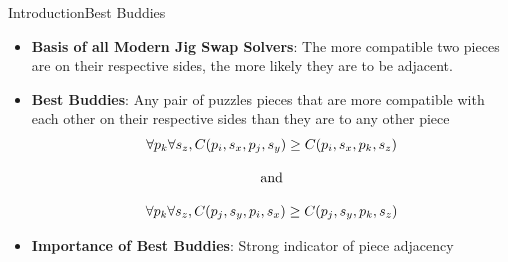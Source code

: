 \documentclass[10pt]{beamer}
\begin{document}
\begin{frame}{Introduction}{Best Buddies}\label{frame:bestBuddies}
    \begin{itemize}
        \item \textbf{Basis of all Modern Jig Swap Solvers}: The more compatible two pieces are on their respective sides, the more likely they are to be adjacent.
        \vfill
        \item \textbf{Best Buddies}: Any pair of puzzles pieces that are more compatible with each other on their respective sides than they are to any other piece~\cite{pomeranz2011}
        \vfill
\begin{equation} \label{eq:pomeranzBestBuddyDefinition}
\centering
\begin{split}
	\begin{matrix}
		\forall{p_{k}}\forall{s_z},C(p_i, s_x, p_j, s_y) \geq C(p_i, s_x, p_k, s_z)
		\\
		\\
		\textnormal{and}
		\\
		\\
		\forall{p_{k}}\forall{s_z},C(p_j, s_y, p_i, s_x) \geq C(p_j, s_y, p_k, s_z)
	\end{matrix}
\end{split}
\end{equation} 
        \vfill
        \item \textbf{Importance of Best Buddies}: Strong indicator of piece adjacency
    \end{itemize}
\end{frame}
\end{document}
